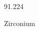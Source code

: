 \documentclass[12pt]{article}
\begin{document}
\hfill{}
\vfill
\begin{center}
  {\fontsize{50}{60}
  }

  91.224

Zirconium
\end{center}
\vfill
\end{document}
